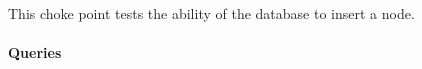 
This choke point tests the ability of the database to insert a node.


\paragraph{Queries}
{\raggedright
}